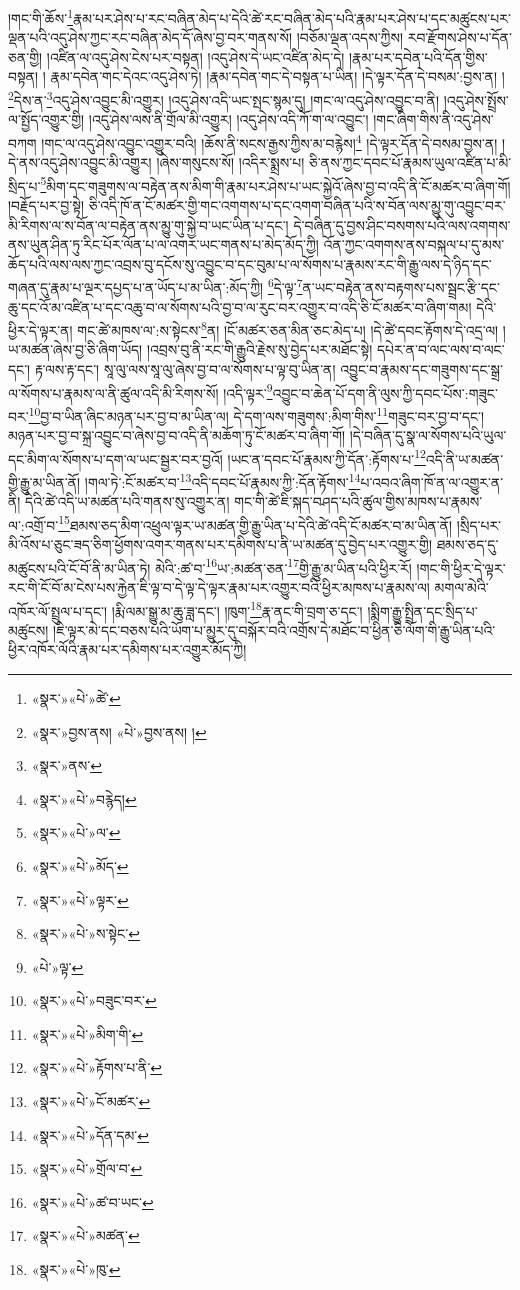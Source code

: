 །གང་གི་ཆོས་\footnote{«སྣར་»«པེ་»ཚེ་}རྣམ་པར་ཤེས་པ་རང་བཞིན་མེད་པ་དེའི་ཚེ་རང་བཞིན་མེད་པའི་རྣམ་པར་ཤེས་པ་དང་མཚུངས་པར་ལྡན་པའི་འདུ་ཤེས་ཀྱང་རང་བཞིན་མེད་དོ་ཞེས་བྱ་བར་གནས་སོ། །བཅོམ་ལྡན་འདས་ཀྱིས། རབ་རྫོགས་ཤེས་པ་དོན་ཅན་གྱི། །འཛིན་ལ་འདུ་ཤེས་ངེས་པར་བསྟན། །འདུ་ཤེས་དེ་ཡང་འཛིན་མེད་དེ། །རྣམ་པར་དབེན་པའི་དོན་གྱིས་བསྟན། །
རྣམ་དབེན་གང་དེའང་འདུ་ཤེས་ཏེ། །རྣམ་དབེན་གང་དེ་བསྟན་པ་ཡིན། །དེ་ལྟར་དོན་དེ་བསམ་:བྱས་ན། །\footnote{«སྣར་»བྱས་ནས། «པེ་»བྱས་ནས། །}དེས་ན་\footnote{«སྣར་»ནས་}འདུ་ཤེས་འབྱུང་མི་འགྱུར། །འདུ་ཤེས་འདི་ཡང་སྤང་སྙམ་དུ། །གང་ལ་འདུ་ཤེས་འབྱུང་བ་ནི། །འདུ་ཤེས་སྤྲོས་ལ་སྤྱོད་འགྱུར་གྱི། །འདུ་ཤེས་ལས་ནི་གྲོལ་མི་འགྱུར། །འདུ་ཤེས་འདི་ཀོ་ག་ལ་འབྱུང་། །གང་ཞིག་གིས་ནི་འདུ་ཤེས་བཀག །གང་ལ་འདུ་ཤེས་འབྱུང་འགྱུར་བའི། །ཆོས་ནི་སངས་རྒྱས་ཀྱིས་མ་བརྙེས།\footnote{«སྣར་»«པེ་»བརྙེད།} །དེ་ལྟར་དོན་དེ་བསམ་བྱས་ན། །དེ་ནས་འདུ་ཤེས་འབྱུང་མི་འགྱུར། །ཞེས་གསུངས་སོ། །འདིར་སྨྲས་པ། ཅི་ནས་ཀྱང་དབང་པོ་རྣམས་ཡུལ་འཛིན་པ་མི་སྲིད་པ་\footnote{«སྣར་»«པེ་»ལ་}མིག་དང་གཟུགས་ལ་བརྟེན་ནས་མིག་གི་རྣམ་པར་ཤེས་པ་ཡང་སྐྱེའོ་ཞེས་བྱ་བ་འདི་ནི་ངོ་མཚར་བ་ཞིག་གོ། །བརྗོད་པར་བྱ་སྟེ། ཅི་འདི་ཁོ་ན་ངོ་མཚར་གྱི་གང་འགགས་པ་དང་འགག་བཞིན་པའི་ས་བོན་ལས་མྱུ་གུ་འབྱུང་བར་མི་རིགས་ལ་ས་བོན་ལ་བརྟེན་ནས་མྱུ་གུ་སྐྱེ་བ་ཡང་ཡིན་པ་དང་། དེ་བཞིན་དུ་བྱས་ཤིང་བསགས་པའི་ལས་འགགས་ནས་ཡུན་ཤིན་ཏུ་རིང་པོར་ལོན་པ་ལ་འགར་ཡང་གནས་པ་མེད་མོད་ཀྱི། འོན་ཀྱང་འགགས་ནས་བསྐལ་པ་དུ་མས་ཆོད་པའི་ལས་ལས་ཀྱང་འབྲས་བུ་དངོས་སུ་འབྱུང་བ་དང་བུམ་པ་ལ་སོགས་པ་རྣམས་རང་གི་རྒྱུ་ལས་དེ་ཉིད་དང་གཞན་དུ་རྣམ་པ་ལྔར་དཔྱད་པ་ན་ཡོད་པ་མ་ཡིན་:མོད་ཀྱི། \footnote{«སྣར་»«པེ་»མོད་}དེ་ལྟ་\footnote{«སྣར་»«པེ་»ལྟར་}ན་ཡང་བརྟེན་ནས་བརྟགས་པས་སྦྲང་རྩི་དང་ཆུ་དང་འོ་མ་འཛིན་པ་དང་འཆུ་བ་ལ་སོགས་པའི་བྱ་བ་ལ་རུང་བར་འགྱུར་བ་འདི་ཅི་ངོ་མཚར་བ་ཞིག་གམ། དེའི་ཕྱིར་དེ་ལྟར་ན། གང་ཚེ་མཁས་ལ་:ས་སྟེངས་\footnote{«སྣར་»«པེ་»ས་སྟེང་}ན། །ངོ་མཚར་ཅན་མིན་ཅང་མེད་པ། །དེ་ཚེ་དབང་རྟོགས་དེ་འདྲ་ལ། །ཡ་མཚན་ཞེས་བྱ་ཅི་ཞིག་ཡོད། །འབྲས་བུ་ནི་རང་གི་རྒྱུའི་རྗེས་སུ་བྱེད་པར་མཐོང་སྟེ། དཔེར་ན་བ་ལང་ལས་བ་ལང་དང་། རྟ་ལས་རྟ་དང་། སཱ་ལུ་ལས་སཱ་ལུ་ཞེས་བྱ་བ་ལ་སོགས་པ་ལྟ་བུ་ཡིན་ན། འབྱུང་བ་རྣམས་དང་གཟུགས་དང་སྒྲ་ལ་སོགས་པ་རྣམས་ལ་ནི་ཚུལ་འདི་མི་རིགས་སོ། །འདི་ལྟར་\footnote{«པེ་»ལྟ་}འབྱུང་བ་ཆེན་པོ་དག་ནི་ལུས་ཀྱི་དབང་པོས་:གཟུང་བར་\footnote{«སྣར་»«པེ་»བཟུང་བར་}བྱ་བ་ཡིན་ཞིང་མཉན་པར་བྱ་བ་མ་ཡིན་ལ། དེ་དག་ལས་གཟུགས་:མིག་གིས་\footnote{«སྣར་»«པེ་»མིག་གི་}གཟུང་བར་བྱ་བ་དང་། མཉན་པར་བྱ་བ་སྐྲ་འབྱུང་བ་ཞེས་བྱ་བ་འདི་ནི་མཆོག་ཏུ་ངོ་མཚར་བ་ཞིག་གོ། །དེ་བཞིན་དུ་སྣ་ལ་སོགས་པའི་ཡུལ་དང་མིག་ལ་སོགས་པ་དག་ལ་ཡང་སྦྱར་བར་བྱའོ། །ཡང་ན་དབང་པོ་རྣམས་ཀྱི་དོན་:རྟོགས་པ་\footnote{«སྣར་»«པེ་»རྟོགས་པ་ནི་}འདི་ནི་ཡ་མཚན་གྱི་རྒྱུ་མ་ཡིན་ནོ། །གལ་ཏེ་:ངོ་མཚར་བ་\footnote{«སྣར་»«པེ་»ངོ་མཚར་}འདི་དབང་པོ་རྣམས་ཀྱི་:དོན་རྟོགས་\footnote{«སྣར་»«པེ་»དོན་དམ་}པ་འབའ་ཞིག་ཁོ་ན་ལ་འགྱུར་ན་ནི། དེའི་ཚེ་འདི་ཡ་མཚན་པའི་གནས་སུ་འགྱུར་ན། གང་གི་ཚེ་ཇི་སྐད་བཤད་པའི་ཚུལ་གྱིས་མཁས་པ་རྣམས་ལ་:འགྲོ་བ་\footnote{«སྣར་»«པེ་»གྲོལ་བ་}ཐམས་ཅད་མིག་འཕྲུལ་ལྟར་ཡ་མཚན་གྱི་རྒྱུ་ཡིན་པ་དེའི་ཚེ་འདི་ངོ་མཚར་བ་མ་ཡིན་ནོ། །སྲིད་པར་མི་འོས་པ་ཅུང་ཟད་ཅིག་ཕྱོགས་འགར་གནས་པར་དམིགས་པ་ནི་ཡ་མཚན་དུ་བྱེད་པར་འགྱུར་གྱི། ཐམས་ཅད་དུ་མཚུངས་པའི་ངོ་བོ་ནི་མ་ཡིན་ཏེ། མེའི་:ཚ་བ་\footnote{«སྣར་»«པེ་»ཚ་བ་ཡང་}ཡ་:མཚན་ཅན་\footnote{«སྣར་»«པེ་»མཚན་}གྱི་རྒྱུ་མ་ཡིན་པའི་ཕྱིར་རོ། །གང་གི་ཕྱིར་དེ་ལྟར་རང་གི་ངོ་བོ་མ་ངེས་པས་རྐྱེན་ཇི་ལྟ་བ་དེ་ལྟ་དེ་ལྟར་རྣམ་པར་འགྱུར་བའི་ཕྱིར་མཁས་པ་རྣམས་ལ། མགལ་མེའི་འཁོར་ལོ་སྤྲུལ་པ་དང་། །རྨི་ལམ་སྒྱུ་མ་ཆུ་ཟླ་དང་། །ཁུག་\footnote{«སྣར་»«པེ་»ཁུ་}རྣ་ནང་གི་བྲག་ཅ་དང་། །སྨིག་རྒྱུ་སྤྲིན་དང་སྲིད་པ་མཚུངས། །ཇི་ལྟར་མེ་དང་བཅས་པའི་ཡོག་པ་མྱུར་དུ་བསྐོར་བའི་འགྲོས་དེ་མཐོང་བ་ཕྱིན་ཅི་ལོག་གི་རྒྱུ་ཡིན་པའི་ཕྱིར་འཁོར་ལོའི་རྣམ་པར་དམིགས་པར་འགྱུར་མོད་ཀྱི། 